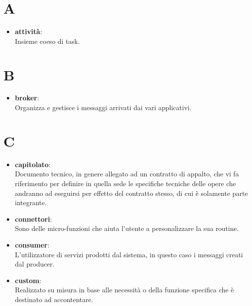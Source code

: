 \documentclass[a4paper, oneside, openany, dvipsnames, table]{article}
\begin{document}
\copertina{}

%
\newpage
\tableofcontents
\newpage

\newpage
\section{A}
\begin{itemize}
\item  \textbf{attività}:\\	Insieme coeso di task.
\end{itemize}

\newpage
\section{B}
\begin{itemize}
\item \textbf{broker}:\\	 Organizza e gestisce i messaggi arrivati dai vari applicativi.
\end{itemize}

\newpage
\section{C}
\begin{itemize}
\item \textbf{capitolato}:\\	Documento tecnico, in genere allegato ad un contratto di appalto, che vi fa riferimento per definire in quella sede le specifiche tecniche delle opere che andranno ad eseguirsi per effetto del contratto stesso, di cui è solamente parte integrante.
\end{itemize}

\begin{itemize}
\item \textbf{connettori}:\\	Sono delle micro-funzioni che aiuta l'utente a personalizzare la sua routine.
\end{itemize}

\begin{itemize}
\item \textbf{consumer}:\\	L'utilizzatore di servizi prodotti dal sistema, in questo caso i messaggi creati dal producer.
\end{itemize}

\begin{itemize}
\item \textbf{custom}:\\	Realizzato su misura in base alle necessità  o della funzione specifica che è destinato ad accontentare.	
\end{itemize}
\end{document}
